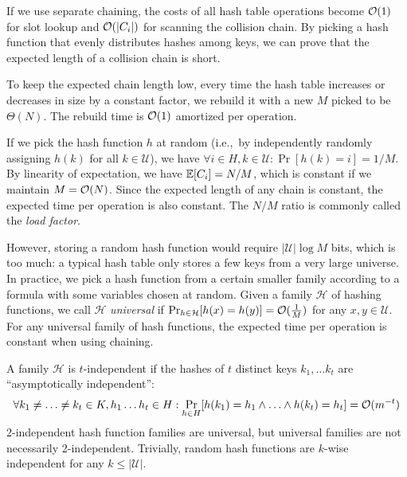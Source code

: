 If we use separate chaining, the costs of all hash table operations become
$\mathcal{O}(1)$ for slot lookup and $\mathcal{O}(|C_i|)$ for scanning the collision chain.
By picking a hash function that evenly distributes hashes among keys,
we can prove that the expected length of a collision chain is short.

To keep the expected chain length low, every time the hash table increases
or decreases in size by a constant factor, we rebuild it with a new $M$
picked to be $\Theta(N)$. The rebuild time is $\mathcal{O}(1)$ amortized per operation.

If we pick the hash function $h$ at random (i.e.,\ by independently randomly
assigning $h(k)$ for all $k\in\mathcal{U}$), we have $\forall i\in H,
k\in\mathcal{U}: \Pr[h(k)=i]=1/M$.
By linearity of expectation, we have $\mathbb{E}[C_i]=N/M$, which is
constant if we maintain $M=\mathcal{O}(N)$. Since the expected length of any chain
is constant, the expected time per operation is also constant.
The $N/M$ ratio is commonly called the \emph{load factor}.

However, storing a random hash function would require $|\mathcal{U}|\log M$
bits, which is too much: a typical hash table only stores a few keys from a
very large universe.
In practice, we pick a hash function from a certain smaller family according to
a formula with some variables chosen at random.
Given a family $\mathcal{H}$ of hashing functions, we call $\mathcal{H}$
\emph{universal} if $\Pr_{h\in \mathcal{H}}[h(x)=h(y)]=\mathcal{O}(\frac{1}{M})$ for any
$x, y\in\mathcal{U}$.
For any universal family of hash functions, the expected time per operation
is constant when using chaining.

A family $\mathcal{H}$ is $t$-independent if the hashes of $t$ distinct keys
$k_1,\ldots k_t$ are ``asymptotically independent'':
$$\forall k_1\neq\ldots \neq k_t\in K,
	h_1\ldots h_t\in H: \Pr_{h\in H}[h(k_1)=h_1\wedge \ldots \wedge
	h(k_t)=h_t]=\mathcal{O}(m^{-t})$$
2-independent hash function families are universal, but universal families
are not necessarily 2-independent.
Trivially, random hash functions are $k$-wise independent for any
$k\leq|\mathcal{U}|$.


